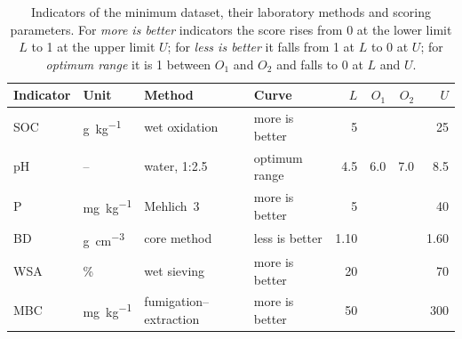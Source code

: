 \begin{table}[htbp]
  \centering\small
  \caption{Indicators of the minimum dataset, their laboratory methods and
    scoring parameters. For \emph{more is better} indicators the score rises
    from 0 at the lower limit $L$ to 1 at the upper limit $U$; for
    \emph{less is better} it falls from 1 at $L$ to 0 at $U$; for
    \emph{optimum range} it is 1 between $O_1$ and $O_2$ and falls to 0 at $L$
    and $U$.}
  \label{tab:scoring}
  \begin{tabular}{@{}llllrrrr@{}}
    \toprule
    Indicator & Unit & Method & Curve & $L$ & $O_1$ & $O_2$ & $U$ \\
    \midrule
    SOC   & \si{\gram\per\kilo\gram}          & wet oxidation     & more is better & 5    &      &      & 25   \\
    pH    & --                                & water, 1:2.5      & optimum range  & 4.5  & 6.0  & 7.0  & 8.5  \\
    P     & \si{\milli\gram\per\kilo\gram}    & Mehlich~3         & more is better & 5    &      &      & 40   \\
    BD    & \si{\gram\per\centi\metre\cubed}  & core method       & less is better & 1.10 &      &      & 1.60 \\
    WSA   & \%                                & wet sieving       & more is better & 20   &      &      & 70   \\
    MBC   & \si{\milli\gram\per\kilo\gram}    & fumigation--extraction & more is better & 50 &   &      & 300  \\
    \bottomrule
  \end{tabular}
\end{table}
